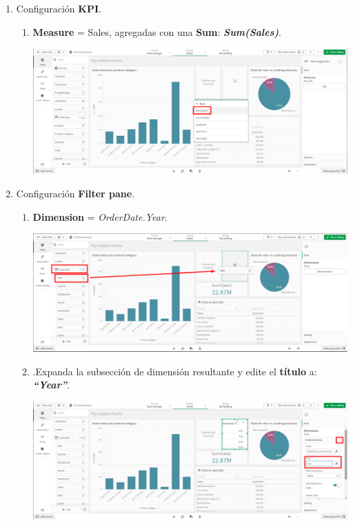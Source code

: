 \documentclass[12pt,letterpaper]{article}
\newcommand\tab[1][1cm]{\hspace*{#1}}
\begin{document}
\begin{enumerate}[\tab 1.]
\begin{enumerate}
\begin{center}
            \end{center}
        \end{enumerate}
        \item Configuración \textbf{KPI}.
        \begin{enumerate}
            \item \textbf{Measure} = Sales, agregadas con una \textbf{Sum}: \textit{\textbf{Sum(Sales)}}.
            \begin{center}
                \includegraphics[width=13cm]{./img/img33.png}
            \end{center}
        \end{enumerate}
        \item Configuración \textbf{Filter pane}.
        \begin{enumerate}
            \item \textbf{Dimension} = \textit{OrderDate.Year}.
            \begin{center}
                \includegraphics[width=13cm]{./img/img34.1.png}
            \end{center}
            \item .Expanda la subsección de dimensión resultante y edite el \textbf{título} a: \textit{\textbf{“Year”}}.
            \begin{center}
                \includegraphics[width=13cm]{./img/img34.2.png}

\end{center}
\end{enumerate}
\end{enumerate}
\end{document}
